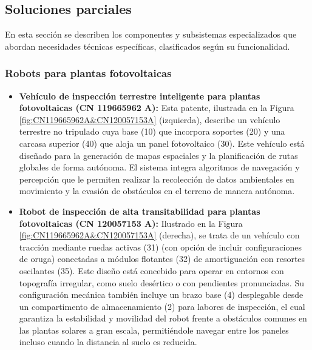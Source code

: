 \documentclass[../../General.tex]{subfiles}
\begin{document}
\vspace{-1.5cm}
\subsection{Soluciones parciales}
En esta sección se describen los componentes y subsistemas especializados que abordan necesidades técnicas específicas, clasificados según su funcionalidad.

\subsubsection{Robots para plantas fotovoltaicas}
\begin{itemize}
	\item \textbf{Vehículo de inspección terrestre inteligente para plantas fotovoltaicas (CN 119665962 A):} Esta patente, ilustrada en la Figura \ref{fig:CN119665962A&CN120057153A} (izquierda), describe un vehículo terrestre no tripulado cuya base (10) que incorpora soportes (20) y una carcasa superior (40) que aloja un panel fotovoltaico (30). Este vehículo está diseñado para la generación de mapas espaciales y la planificación de rutas globales de forma autónoma. El sistema integra algoritmos de navegación y percepción que le permiten realizar la recolección de datos ambientales en movimiento y la evasión de obstáculos en el terreno de manera autónoma.
	
	\item \textbf{Robot de inspección de alta transitabilidad para plantas fotovoltaicas (CN 120057153 A):} Ilustrado en la Figura \ref{fig:CN119665962A&CN120057153A} (derecha), se trata de un vehículo con tracción mediante ruedas activas (31) (con opción de incluir configuraciones de oruga) conectadas a módulos flotantes (32) de amortiguación con resortes oscilantes (35). Este diseño está concebido para operar en entornos con topografía irregular, como suelo desértico o con pendientes pronunciadas. Su configuración mecánica también incluye un brazo base (4) desplegable desde un compartimento de almacenamiento (2) para labores de inspección, el cual garantiza la estabilidad y movilidad del robot frente a obstáculos comunes en las plantas solares a gran escala, permitiéndole navegar entre los paneles incluso cuando la distancia al suelo es reducida.
	
	
	\begin{figure}[H]
		
		\captionsetup{justification=raggedright, singlelinecheck=false, labelsep=none}
		

\end{figure}
\end{itemize}
\end{document}
